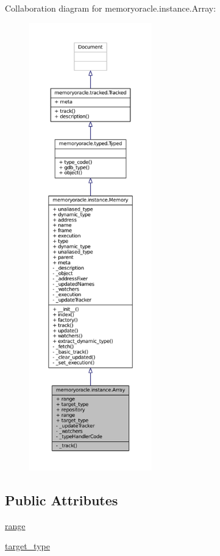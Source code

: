 Collaboration diagram for memoryoracle.\+instance.\+Array\+:
\nopagebreak
\begin{figure}[H]
\begin{center}
\leavevmode
\includegraphics[height=550pt]{classmemoryoracle_1_1instance_1_1Array__coll__graph}
\end{center}
\end{figure}
\subsection*{Public Attributes}
\begin{DoxyCompactItemize}
\item 
\hyperlink{classmemoryoracle_1_1instance_1_1Array_a8bf8e1844305ec3dc5d73ec1ed8c5ba3}{range}
\item 
\hyperlink{classmemoryoracle_1_1instance_1_1Array_aa69695506b2de9ec3336d03efb4fea09}{target\+\_\+type}
\end{DoxyCompactItemize}
